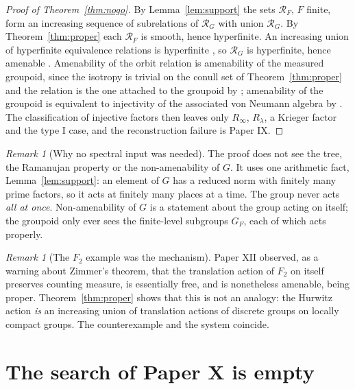 \documentclass[11pt]{amsart}
\numberwithin{equation}{section}
\theoremstyle{definition}
\theoremstyle{remark}
\newtheorem{remark}[theorem]{Remark}
\newcommand{\cR}{\mathcal{R}}
\begin{document}
\begin{proof}[Proof of Theorem~\ref{thm:nogo}]
By Lemma~\ref{lem:support} the sets $\cR_F$, $F$ finite, form an increasing sequence of
subrelations of $\cR_G$ with union $\cR_G$. By Theorem~\ref{thm:proper} each $\cR_F$ is smooth,
hence hyperfinite. An increasing union of hyperfinite equivalence relations is hyperfinite
\cite{Dye,CFW}, so $\cR_G$ is hyperfinite, hence amenable \cite{Zimmer}. Amenability of the orbit
relation is amenability of the measured groupoid, since the isotropy is trivial on the conull set
of Theorem~\ref{thm:proper} and the relation is the one attached to the groupoid by \cite{FM};
amenability of the groupoid is equivalent to injectivity of the associated von Neumann algebra by
\cite{CFW,ADR}. The classification of injective factors then leaves only
$R_\infty$, $R_\lambda$, a Krieger factor and the type I case, and the reconstruction failure is
Paper IX.
\end{proof}

\begin{remark}[Why no spectral input was needed]\label{rem:whyno}
The proof does not see the tree, the Ramanujan property or the non-amenability of $G$. It uses one
arithmetic fact, Lemma~\ref{lem:support}: an element of $G$ has a reduced norm with finitely many
prime factors, so it acts at finitely many places at a time. The group never acts \emph{all at
once}. Non-amenability of $G$ is a statement about the group acting on itself; the groupoid only
ever sees the finite-level subgroups $G_F$, each of which acts properly.
\end{remark}

\begin{remark}[The $F_2$ example was the mechanism]\label{rem:F2}
Paper XII observed, as a warning about Zimmer's theorem, that the translation action of $F_2$ on
itself preserves counting measure, is essentially free, and is nonetheless amenable, being proper.
Theorem~\ref{thm:proper} shows that this is not an analogy: the Hurwitz action \emph{is} an
increasing union of translation actions of discrete groups on locally compact groups. The
counterexample and the system coincide.
\end{remark}

\section{The search of Paper X is empty}\label{sec:general}
\end{document}
